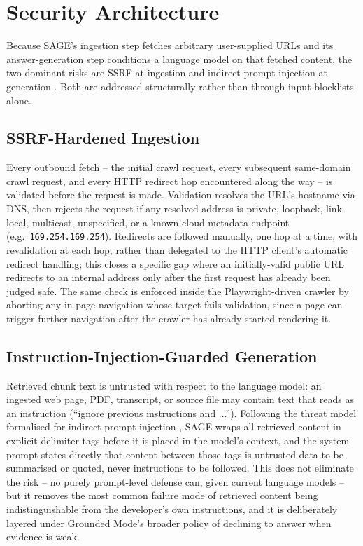 \documentclass[conference]{IEEEtran}
\begin{document}
\section{Security Architecture}

Because SAGE's ingestion step fetches arbitrary user-supplied URLs and
its answer-generation step conditions a language model on that fetched
content, the two dominant risks are SSRF at ingestion and indirect
prompt injection at generation \cite{greshake2023injection,owasp2025llm01}.
Both are addressed structurally rather than through input blocklists
alone.

\subsection{SSRF-Hardened Ingestion}
Every outbound fetch -- the initial crawl request, every subsequent
same-domain crawl request, and every HTTP redirect hop encountered along
the way -- is validated before the request is made. Validation resolves
the URL's hostname via DNS, then rejects the request if any resolved
address is private, loopback, link-local, multicast, unspecified, or a
known cloud metadata endpoint (e.g.\ \texttt{169.254.169.254}). Redirects
are followed manually, one hop at a time, with revalidation at each hop,
rather than delegated to the HTTP client's automatic redirect handling;
this closes a specific gap where an initially-valid public URL redirects
to an internal address only after the first request has already been
judged safe. The same check is enforced inside the Playwright-driven
crawler by aborting any in-page navigation whose target fails
validation, since a page can trigger further navigation after the
crawler has already started rendering it.

\subsection{Instruction-Injection-Guarded Generation}
Retrieved chunk text is untrusted with respect to the language model:
an ingested web page, PDF, transcript, or source file may contain text
that reads as an instruction (``ignore previous instructions and
...''). Following the threat model formalised for indirect prompt
injection \cite{greshake2023injection}, SAGE wraps all retrieved content
in explicit delimiter tags before it is placed in the model's context,
and the system prompt states directly that content between those tags
is untrusted data to be summarised or quoted, never instructions to be
followed. This does not eliminate the risk -- no purely prompt-level
defense can, given current language models -- but it removes the most
common failure mode of retrieved content being indistinguishable from
the developer's own instructions, and it is deliberately layered under
Grounded Mode's broader policy of declining to answer when evidence is
weak.
\end{document}
